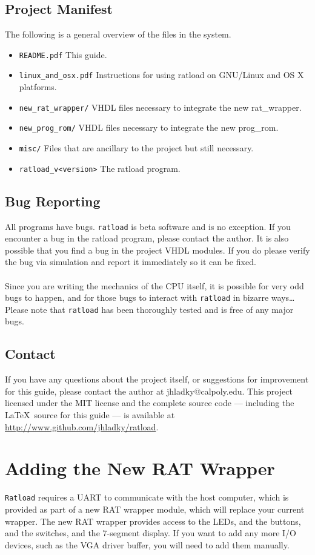 \documentclass[notitlepage]{article}
\begin{document}
\subsection{Project Manifest}
The following is a general overview of the files in the system.
\begin{itemize}
\item \texttt{README.pdf} This guide.
\item \texttt{linux\_and\_osx.pdf} Instructions for using ratload on GNU/Linux and OS X platforms.
\item \texttt{new\_rat\_wrapper/} VHDL files necessary to integrate the new rat\_wrapper.
\item \texttt{new\_prog\_rom/} VHDL files necessary to integrate the new prog\_rom.
\item \texttt{misc/} Files that are ancillary to the project but still necessary.
\item \texttt{ratload\_v{\textless}version\textgreater} The ratload program.
\end{itemize}

\subsection{Bug Reporting}
All programs have bugs. \texttt{ratload} is beta software and is no exception. If you encounter a bug in the ratload program, please contact the author. It is also possible that you find a bug in the project VHDL modules. If you do please verify the bug via simulation and report it immediately so it can be fixed.\\\\
Since you are writing the mechanics of the CPU itself, it is possible for very odd bugs to happen, and for those bugs to interact with \texttt{ratload} in bizarre ways\ldots Please note that \texttt{ratload} has been thoroughly tested and is free of any major bugs.

\subsection{Contact}
If you have any questions about the project itself, or suggestions for improvement for this guide, please contact the author at jhladky@calpoly.edu. This project licensed under the MIT license and the complete source code --- including the \LaTeX ~source for this guide --- is available at \url{http://www.github.com/jhladky/ratload}.

\section{Adding the New RAT Wrapper}
\texttt{Ratload} requires a UART to communicate with the host computer, which is provided as part of a new RAT wrapper module, which will replace your current wrapper. The new RAT wrapper provides access to the LEDs, and the buttons, and the switches, and the 7-segment display. If you want to add any more I/O devices, such as the VGA driver buffer, you will need to add them manually.
\end{document}
